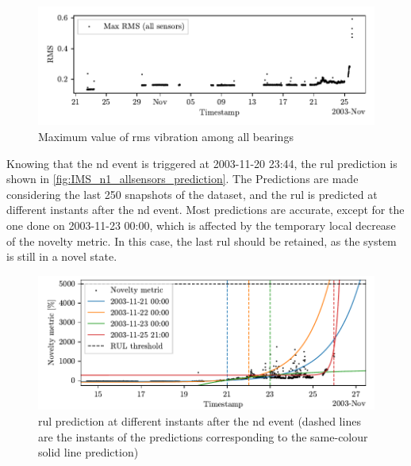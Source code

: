 \begin{figure}
    \centering
    \includegraphics{images/IMS/Novelty_01_RMS_allsensors.pdf}
    \caption{Maximum value of \gls{rms} vibration among all bearings}
    \label{fig:IMS_n1_allsensors_RMS}
\end{figure}

Knowing that the \gls{nd} event is triggered at 2003-11-20 23:44, the \gls{rul} prediction is shown in \autoref{fig:IMS_n1_allsensors_prediction}. The Predictions are made considering the last 250 snapshots of the dataset, and the \gls{rul} is predicted at different instants after the \gls{nd} event. Most predictions are accurate, except for the one done on 2003-11-23 00:00, which is affected by the temporary local decrease of the novelty metric. In this case, the last \gls{rul} should be retained, as the system is still in a novel state.

\begin{figure}
    \centering
    \includegraphics[width=\textwidth]{images/IMS/Novelty_01_500samples_allsensors_predictions.pdf}
    \caption{\gls{rul} prediction at different instants after the \gls{nd} event (dashed lines are the instants of the predictions corresponding to the same-colour solid line prediction)}
    \label{fig:IMS_n1_allsensors_prediction}
\end{figure}